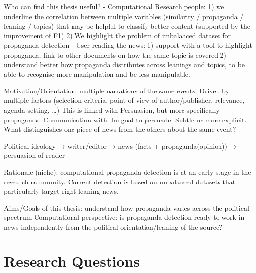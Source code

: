 Who can find this thesis useful?
- Computational Research people:
    1) we underline the correlation between multiple variables (similarity / propaganda / leaning / topics) that may be helpful to classify better content (supported by the improvement of F1)
    2) We highlight the problem of imbalanced dataset for propaganda detection
- User reading the news: 
    1) support with a tool to highlight propaganda, link to other documents on how the same topic is covered
    2) understand better how propaganda distributes across leanings and topics, to be able to recognise more manipulation and be less manipulable.

Motivation/Orientation: multiple narrations of the same events. Driven by multiple factors (selection criteria, point of view of author/publisher, relevance, agenda-setting, …)
This is linked with Persuasion, but more specifically propaganda. Communication with the goal to persuade. Subtle or more explicit.
What distinguishes one piece of news from the others about the same event? 

Political ideology → writer/editor → news (facts + propaganda(opinion)) → persuasion of reader

Rationale (niche): computational propaganda detection is at an early stage in the research community. Current detection is based on unbalanced datasets that particularly target right-leaning news.

Aims/Goals of this thesis: 
understand how propaganda varies across the political spectrum
Computational perspective: is propaganda detection ready to work in news independently from the political orientation/leaning of the source?




\section{Research Questions}
\label{sec:intro_rqs}



